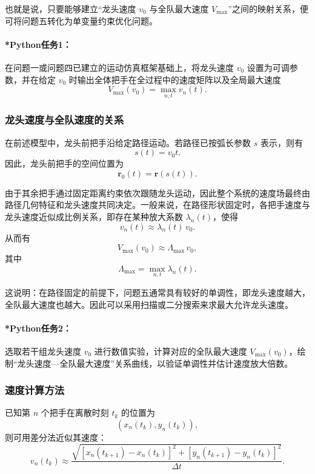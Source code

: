 \documentclass[12pt,a4paper]{ctexart}
\begin{document}
也就是说，只要能够建立“龙头速度 $v_0$ 与全队最大速度 $V_{\max}$”之间的映射关系，便可将问题五转化为单变量约束优化问题。

\paragraph{*Python任务1：}
在问题一或问题四已建立的运动仿真框架基础上，将龙头速度 $v_0$ 设置为可调参数，并在给定 $v_0$ 时输出全体把手在全过程中的速度矩阵以及全局最大速度
\[
V_{\max}(v_0)=\max_{n,t} v_n(t).
\]

\subsubsection{龙头速度与全队速度的关系}
在前述模型中，龙头前把手沿给定路径运动。若路径已按弧长参数 $s$ 表示，则有
\begin{equation}
s(t)=v_0 t.
\end{equation}
因此，龙头前把手的空间位置为
\begin{equation}
\bm{r}_0(t)=\bm{r}(s(t)).
\end{equation}

由于其余把手通过固定距离约束依次跟随龙头运动，因此整个系统的速度场最终由路径几何特征和龙头速度共同决定。一般来说，在路径形状固定时，各把手速度与龙头速度近似成比例关系，即存在某种放大系数 $\lambda_n(t)$，使得
\begin{equation}
v_n(t)\approx \lambda_n(t)\,v_0.
\end{equation}
从而有
\begin{equation}
V_{\max}(v_0)\approx \Lambda_{\max}\,v_0,
\end{equation}
其中
\begin{equation}
\Lambda_{\max}=\max_{n,t}\lambda_n(t).
\end{equation}

这说明：在路径固定的前提下，问题五通常具有较好的单调性，即龙头速度越大，全队最大速度也越大。因此可以采用扫描或二分搜索来求最大允许龙头速度。

\paragraph{*Python任务2：}
选取若干组龙头速度 $v_0$ 进行数值实验，计算对应的全队最大速度 $V_{\max}(v_0)$，绘制“龙头速度—全队最大速度”关系曲线，以验证单调性并估计速度放大倍数。

\subsubsection{速度计算方法}
已知第 $n$ 个把手在离散时刻 $t_k$ 的位置为
\[
(x_n(t_k),y_n(t_k)),
\]
则可用差分法近似其速度：
\begin{equation}
v_n(t_k)\approx
\frac{\sqrt{[x_n(t_{k+1})-x_n(t_k)]^2+[y_n(t_{k+1})-y_n(t_k)]^2}}{\Delta t}.
\end{equation}
\end{document}
